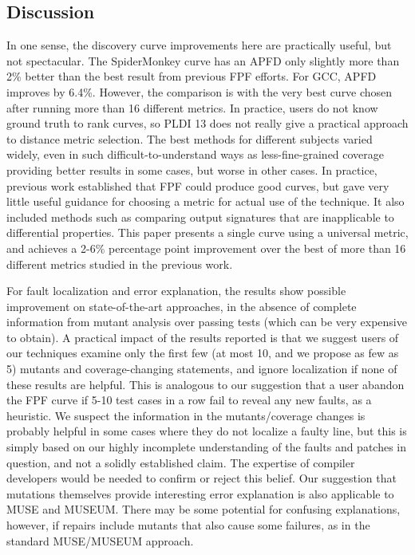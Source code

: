 \subsection{Discussion}

In one sense, the discovery curve improvements here are practically useful, but not spectacular.  The SpiderMonkey curve has an APFD only slightly more than 2\% better than the best result from previous FPF efforts.  For GCC, APFD improves by 6.4\%.  However, the comparison is with the very best curve chosen after running more than 16 different metrics.  In practice, users do not know ground truth to rank curves, so PLDI 13 does not really give a practical approach to distance metric selection.  The best methods for different subjects varied widely, even in such difficult-to-understand ways as less-fine-grained coverage providing better results in some cases, but worse in other cases.   In practice, previous work established that FPF could produce good curves, but gave very little useful guidance for choosing a metric for actual use of the technique.  It also included methods such as comparing output signatures that are inapplicable to differential properties.  This paper presents a single curve using a universal metric, and achieves a 2-6\% percentage point improvement over the best of more than 16 different metrics studied in the previous work.

For fault localization and error explanation, the results show possible improvement on state-of-the-art approaches, in the absence of complete information from mutant analysis over passing tests (which can be very expensive to obtain).  A practical impact of the results reported is that we suggest users of our techniques examine only the first few (at most 10, and we propose as few as 5) mutants and coverage-changing statements, and ignore localization if none of these results are helpful.  This is analogous to our suggestion that a user abandon the FPF curve if 5-10 test cases in a row fail to reveal any new faults, as a heuristic.  We suspect the information in the mutants/coverage changes is probably helpful in some cases where they do not localize a faulty line, but this is simply based on our highly incomplete understanding of the faults and patches in question, and not a solidly established claim.  The expertise of compiler developers would be needed to confirm or reject this belief.  Our suggestion that mutations themselves provide interesting error explanation is also applicable to MUSE and MUSEUM.  There may be some potential for confusing explanations, however, if repairs include mutants that also cause some failures, as in the standard MUSE/MUSEUM approach.

